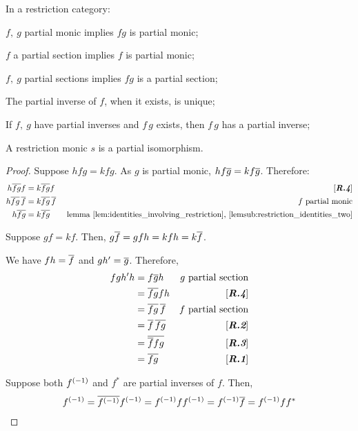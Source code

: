 \begin{lemma}\label{lem:rcs_partial_monic_section_inverse_properties}
In a restriction category:
\bproofenum
\item $f,\ g$ partial monic implies $f g$ is partial monic;
\item $f$ a partial section implies $f$ is partial monic;
\item $f,\ g$ partial sections implies $f g$ is a partial section;
\item The partial inverse of $f$, when it exists, is unique;
\item If $f,\ g$ have partial inverses and $f\,g$ exists, then $f\,g$ has a partial inverse;
\item A restriction monic $s$ is a partial isomorphism.
\eproofenum
\end{lemma}
\begin{proof}
\bproofenum
\item Suppose $h f g = k f g$. As $g$ is partial monic,
$h f \overline{g} = k f \overline{g}$. Therefore:
\begin{align*}
h \overline{f g} f &= k \overline{f g} f &[\emph{\bfseries R.4}]\\
h \overline{f g}\,\overline{f} &= k \overline{f g}\, \overline{f} & f\text{
partial monic}\\
h \overline{fg}&= k \overline{fg} & \text{
    lemma \ref{lem:identities_involving_restriction},
      \ref{lemsub:restriction_identities_two}}
\end{align*}
\item Suppose $g f = k f$. Then, $g\overline{f} = g f h = k f h = k \overline{f}$.
\item We have $f h = \overline{f}$ and $g h' = \overline{g}$. Therefore,
\begin{align*}
f g h' h &= f \overline{g} h & g \text{ partial section}\\
&= \overline{f g} f h & [\emph{\bfseries R.4}]\\
&= \overline{f g}\, \overline{f} & f \text{ partial section}\\
&= \overline{f}\, \overline{f g} & [\emph{\bfseries R.2}]\\
&= \overline{\overline{f}f g} & [\emph{\bfseries R.3}]\\
&= \overline{f g} & [\emph{\bfseries R.1}]
\end{align*}
\item Suppose both ${f}^{(-1)}$ and $f^*$ are partial inverses of $f$. Then,
\begin{multline*}
\inv{f}
= \restr{\inv{f}}\inv{f} %
=\inv{f}f\inv{f}  %
= \inv{f} \restr{f}   %
= \inv{f} f f^*   %

\end{multline*}
\end{proof}
